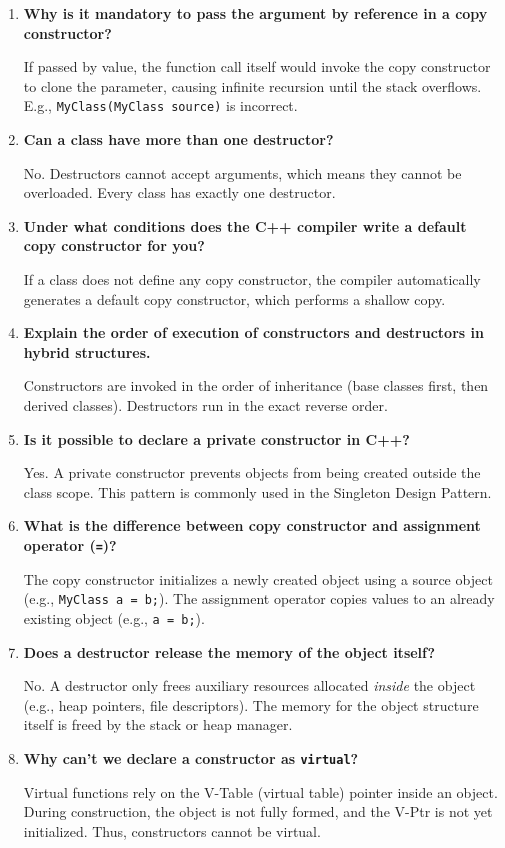 \documentclass[12pt,a4paper]{article}
\newcommand{\Q}[1]{\textbf{#1}\par\noindent\ignorespaces}
\begin{document}
\begin{tcolorbox}[exambox, title={\textbf{Frequently Asked / Viva Questions}}]
\begin{enumerate}[topsep=0pt, label=\textbf{Q\arabic*.}, itemsep=5pt]
  \item \Q{Why is it mandatory to pass the argument by reference in a copy constructor?}
    If passed by value, the function call itself would invoke the copy constructor to clone the parameter, causing infinite recursion until the stack overflows. E.g., \texttt{MyClass(MyClass source)} is incorrect.
  \item \Q{Can a class have more than one destructor?}
    No. Destructors cannot accept arguments, which means they cannot be overloaded. Every class has exactly one destructor.
  \item \Q{Under what conditions does the C++ compiler write a default copy constructor for you?}
    If a class does not define any copy constructor, the compiler automatically generates a default copy constructor, which performs a shallow copy.
  \item \Q{Explain the order of execution of constructors and destructors in hybrid structures.}
    Constructors are invoked in the order of inheritance (base classes first, then derived classes). Destructors run in the exact reverse order.
  \item \Q{Is it possible to declare a private constructor in C++?}
    Yes. A private constructor prevents objects from being created outside the class scope. This pattern is commonly used in the Singleton Design Pattern.
  \item \Q{What is the difference between copy constructor and assignment operator (\texttt{=})?}
    The copy constructor initializes a newly created object using a source object (e.g., \texttt{MyClass a = b;}). The assignment operator copies values to an already existing object (e.g., \texttt{a = b;}).
  \item \Q{Does a destructor release the memory of the object itself?}
    No. A destructor only frees auxiliary resources allocated \textit{inside} the object (e.g., heap pointers, file descriptors). The memory for the object structure itself is freed by the stack or heap manager.
  \item \Q{Why can't we declare a constructor as \texttt{virtual}?}
    Virtual functions rely on the V-Table (virtual table) pointer inside an object. During construction, the object is not fully formed, and the V-Ptr is not yet initialized. Thus, constructors cannot be virtual.

\end{enumerate}
\end{tcolorbox}
\end{document}
